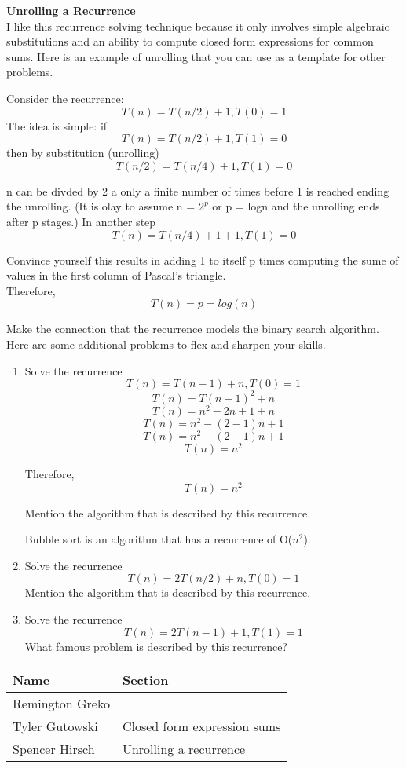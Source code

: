 \documentclass{article}
\begin{document}
\noindent \textbf{Unrolling a Recurrence}\\

\noindent I like this recurrence solving technique because it only involves
simple algebraic substitutions and an ability to compute closed form expressions
for common sums. Here is an example of unrolling that you can use as a template
for other problems.

Consider the recurrence:
\[ T(n) = T(n/2) + 1, T(0) = 1 \]
The idea is simple: if
\[ T(n) = T(n/2) + 1, T(1) = 0 \]
then by substitution (unrolling)
\[ T(n/2) = T(n/4) + 1, T(1) = 0 \]

\noindent n can be divded by 2 a only a finite number of times before 1 is
reached ending the unrolling. (It is olay to assume n = $2^p$ or p = logn and the
unrolling ends after p stages.) In another step
\[ T(n) = T(n/4) + 1 + 1, T(1) = 0 \]

\noindent Convince yourself this results in adding 1 to itself p times computing
the sume of values in the first column of Pascal's triangle.\\
Therefore,
\[ T(n) = p = log(n) \]

\noindent Make the connection that the recurrence models the binary search algorithm.\\
\noindent Here are some additional problems to flex and sharpen your skills.

\begin{enumerate}
    \item Solve the recurrence
            \[ T(n) = T(n-1) + n, T(0) = 1 \]
            \[ T(n) = T(n-1)^2 + n\]
            \[ T(n) = n^2 -2n + 1 + n\]
            \[ T(n) = n^2 - (2-1)n + 1\]
            \[ T(n) = n^2 - (2-1)n + 1\]
            \[T(n) = n^2\]

            Therefore, \[T(n) = n^2\]

            Mention the algorithm that is described by this recurrence.

            Bubble sort is an algorithm that has a recurrence of O($n^2$).
    \item Solve the recurrence
            \[ T(n) = 2T(n/2) + n, T(0) = 1 \]
            Mention the algorithm that is described by this recurrence.
    \item Solve the recurrence
            \[ T(n) = 2T(n-1) + 1, T(1) = 1 \]
            What famous problem is described by this recurrence?
\end{enumerate}


\pagebreak

\begin{center}
        \begin{tabular}{|p{3cm}|p{6cm}|}
            \hline
            \textbf{Name} & \textbf{Section} \\
            \hline
            Remington Greko & \\
            \hline
            Tyler Gutowski & Closed form expression sums\\
            \hline
            Spencer Hirsch & Unrolling a recurrence \\
            \hline
        \end{tabular}
    \end{center}
\end{document}
